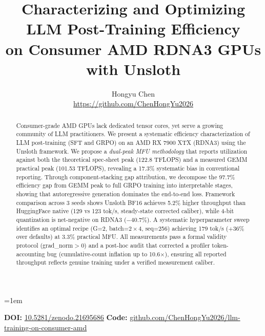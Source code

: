 \documentclass[11pt]{article}
\title{Characterizing and Optimizing LLM Post-Training Efficiency\\on Consumer AMD RDNA3 GPUs with Unsloth}
\author{
  Hongyu Chen\\
  \url{https://github.com/ChenHongYu2026}
}
\date{}
\begin{document}
\emergencystretch=1em
\maketitle
\vspace{-2em}
\begin{center}\small
\textbf{DOI:} \href{https://doi.org/10.5281/zenodo.21695686}{10.5281/zenodo.21695686} \quad
\textbf{Code:} \href{https://github.com/ChenHongYu2026/llm-training-on-consumer-amd}{github.com/ChenHongYu2026/llm-training-on-consumer-amd}
\end{center}
\vspace{1em}

\begin{abstract}
Consumer-grade AMD GPUs lack dedicated tensor cores, yet serve a growing community of LLM practitioners. We present a systematic efficiency characterization of LLM post-training (SFT and GRPO) on an AMD RX 7900 XTX (RDNA3) using the Unsloth framework. We propose a \emph{dual-peak MFU methodology} that reports utilization against both the theoretical spec-sheet peak (122.8 TFLOPS) and a measured GEMM practical peak (101.53 TFLOPS), revealing a 17.3\% systematic bias in conventional reporting. Through component-stacking gap attribution, we decompose the 97.7\% efficiency gap from GEMM peak to full GRPO training into interpretable stages, showing that autoregressive generation dominates the end-to-end loss. Framework comparison across 3 seeds shows Unsloth BF16 achieves 5.2\% higher throughput than HuggingFace native (129 vs 123 tok/s, steady-state corrected caliber), while 4-bit quantization is net-negative on RDNA3 ($-$40.7\%). A systematic hyperparameter sweep identifies an optimal recipe (G=2, batch=$2\!\times\!4$, seq=256) achieving 179 tok/s ($+$36\% over defaults) at 3.3\% practical MFU. All measurements pass a formal validity protocol (grad\_norm$>$0) and a post-hoc audit that corrected a profiler token-accounting bug (cumulative-count inflation up to 10.6$\times$), ensuring all reported throughput reflects genuine training under a verified measurement caliber.
\end{abstract}












\end{document}
